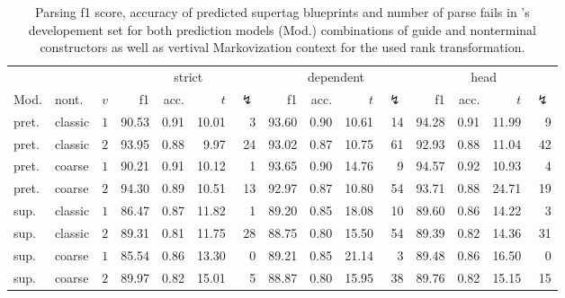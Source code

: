 \documentclass[../../document.tex]{subfiles}
\begin{document}
    \begin{table}
        \caption{\label{tbl:experiments:dptb}
        Parsing f1 score, accuracy of predicted supertag blueprints and number of parse fails in 's developement set for both prediction models (Mod.) combinations of guide and nonterminal constructors as well as vertival Markovization context for the used rank transformation.
        }
        \centering
        \setlength{\tabcolsep}{4pt}
        \vspace{.2cm}
        \begin{tabular}{llc|rrrr|rrrr|rrrr}
            \toprule
  &             &        & \multicolumn{4}{c|}{strict} & \multicolumn{4}{c|}{dependent} & \multicolumn{4}{c}{head}  \\
Mod. &     nont.   &\(v\)   & f1 & acc. & $t$ & $\lightning$ & f1 & acc. & $t$ & $\lightning$ & f1 & acc. & $t$ & $\lightning$ \\ \hline
pret. &     classic & \(1\)  & 90.53 & 0.91 & 10.01 & 3 & 93.60 & 0.90 & 10.61 & 14 & 94.28 & 0.91 & 11.99 & 9 \\
pret. &     classic & \(2\)  & 93.95 & 0.88 & 9.97 & 24 & 93.02 & 0.87 & 10.75 & 61 & 92.93 & 0.88 & 11.04 & 42 \\
pret. &     coarse  & \(1\)  & 90.21 & 0.91 & 10.12 & 1 & 93.65 & 0.90 & 14.76 & 9 & 94.57 & 0.92 & 10.93 & 4 \\
pret. &     coarse  & \(2\)  & 94.30 & 0.89 & 10.51 & 13 & 92.97 & 0.87 & 10.80 & 54 & 93.71 & 0.88 & 24.71 & 19 \\
\midrule
sup. & classic & \(1\)  & 86.47 & 0.87 & 11.82 & 1 & 89.20 & 0.85 & 18.08 & 10 & 89.60 & 0.86 & 14.22 & 3 \\
sup. & classic & \(2\)  & 89.31 & 0.81 & 11.75 & 28 & 88.75 & 0.80 & 15.50 & 54 & 89.39 & 0.82 & 14.36 & 31 \\
sup. & coarse  & \(1\)  & 85.54 & 0.86 & 13.30 & 0 & 89.21 & 0.85 & 21.14 & 3 & 89.48 & 0.86 & 16.50 & 0 \\
sup. & coarse  & \(2\)  & 89.97 & 0.82 & 15.01 & 5 & 88.87 & 0.80 & 15.95 & 38 & 89.76 & 0.82 & 15.15 & 15 \\
    \bottomrule
        \end{tabular}
    \end{table}
\end{document}
